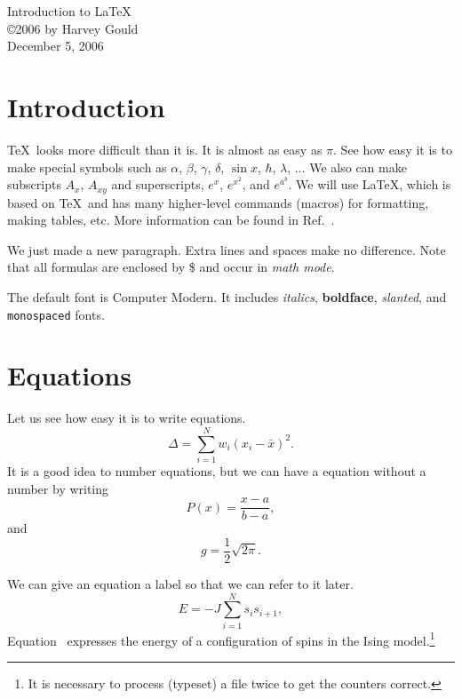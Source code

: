 \documentclass[12pt]{article}
\begin{document}
\begin{center}
{\large Introduction to \LaTeX} \\ %
\copyright 2006 by Harvey Gould \\
		December 5, 2006
\end{center}

\section{Introduction}
  \TeX\ looks more difficult than it is. It is
		almost as easy as $\pi$. See how easy it is to make special
		symbols such as $\alpha$,
		$\beta$, $\gamma$,
		$\delta$, $\sin x$, $\hbar$, $\lambda$, $\ldots$ We also can make
		subscripts
		$A_{x}$, $A_{xy}$ and superscripts, $e^x$, $e^{x^2}$, and
		$e^{a^b}$. We will use \LaTeX, which is based on \TeX\ and has
		many higher-level commands (macros) for formatting, making
		tables, etc. More information can be found in Ref.~\cite{latex}.

		We just made a new paragraph. Extra lines and spaces make no
		difference. Note that all formulas are enclosed by
		\$ and occur in \textit{math mode}.

		The default font is Computer Modern. It includes \textit{italics},
		\textbf{boldface},
		\textsl{slanted}, and \texttt{monospaced} fonts.

		\section{Equations}
		Let us see how easy it is to write equations.
		\begin{equation}
		\Delta =\sum_{i=1}^N w_i (x_i - \bar{x})^2 .
		\end{equation}
		It is a good idea to number equations, but we can have a
		equation without a number by writing
		\begin{equation}
		P(x) = \frac{x - a}{b - a} , \nonumber
		\end{equation}
		and
		\begin{equation}
		g = \frac{1}{2} \sqrt{2\pi} . \nonumber
		\end{equation}

		We can give an equation a label so that we can refer to it later.
		\begin{equation}
		\label{eq:ising}
		E = -J \sum_{i=1}^N s_i s_{i+1} ,
		\end{equation}
		Equation~ expresses the energy of a configuration
		of spins in the Ising model.\footnote{It is necessary to process (typeset) a
			file twice to get the counters correct.}
\end{document}
